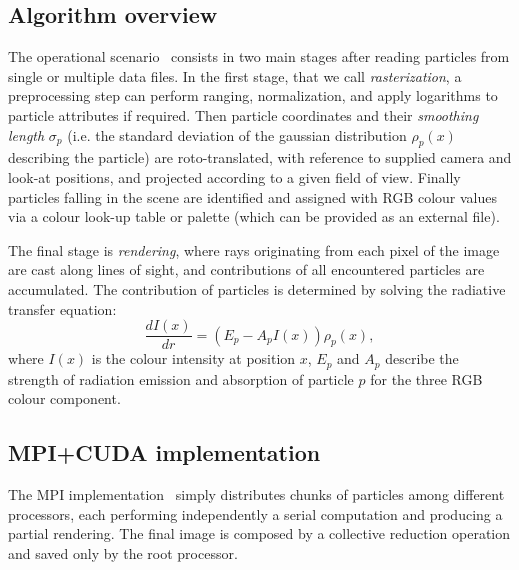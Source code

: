 \documentclass{egpubl}
\begin{document}
\subsection{Algorithm overview }

The operational scenario~\cite{DRGI08} consists in two main stages after reading particles from single or multiple data files. 
In the first stage, that we call \textit{rasterization}, a preprocessing step can perform ranging, normalization, and apply logarithms to particle attributes if required. Then particle coordinates and their \textit{smoothing length} $\sigma_p$ (i.e. the standard deviation of the gaussian distribution $\rho_p(x)$ describing the particle) are roto-translated, with reference to supplied camera and look-at positions, and projected according to a given field of view. Finally particles falling in the scene are identified and assigned with RGB colour values via a colour look-up table or palette (which can be provided as an external file).

The final stage is \textit{rendering}, where rays originating from each pixel of the image are cast along lines of sight, and contributions of all encountered particles are accumulated. The contribution of particles is determined by solving the radiative transfer equation:
\begin{equation}\label{rad}
 \frac{d I(x)}{dr}=( E_p- A_p I(x))\rho_p(x),
\end{equation}
where $I(x)$ is the colour intensity at position $x$, $E_p$ and $A_p$ describe the strength of radiation emission and absorption of particle $p$ for the three RGB colour component.

\subsection{MPI+CUDA implementation}
The MPI implementation~\cite{JKR*10} simply distributes chunks of particles among different processors, each performing independently a serial computation and producing a partial rendering. The final image is composed by a collective reduction operation and saved only by the root processor.
\end{document}
